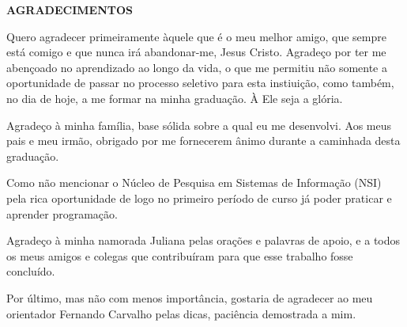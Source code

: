 \begin{center}
\textbf{AGRADECIMENTOS}
\end{center}

Quero agradecer primeiramente àquele que é o meu melhor amigo, que sempre está comigo e que nunca irá abandonar-me, Jesus Cristo. Agradeço por ter me abençoado no aprendizado ao longo da vida, o que me permitiu não somente a oportunidade de passar no processo seletivo para esta instiuição, como também, no dia de hoje, a me formar na minha graduação. À Ele seja a glória.

Agradeço à minha família, base sólida sobre a qual eu me desenvolvi. Aos meus pais e meu irmão, obrigado por me fornecerem ânimo durante a caminhada desta graduação.

Como não mencionar o Núcleo de Pesquisa em Sistemas de Informação (NSI) pela rica oportunidade de logo no primeiro período de curso já poder praticar e aprender programação.

Agradeço à minha namorada Juliana pelas orações e palavras de apoio, e a todos os meus amigos e colegas que contribuíram para que esse trabalho fosse concluído. 

Por último, mas não com menos importância, gostaria de agradecer ao meu orientador Fernando Carvalho pelas dicas, paciência demostrada a mim.